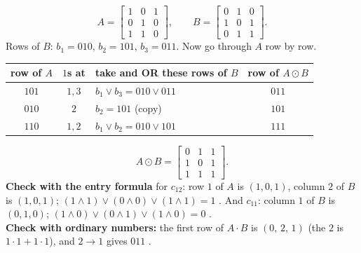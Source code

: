 \documentclass{fkt-notes}
\theoremstyle{definition}
\begin{document}
\begin{example}
  \[
    A=\begin{bmatrix}1&0&1\\0&1&0\\1&1&0\end{bmatrix},\qquad
    B=\begin{bmatrix}0&1&0\\1&0&1\\0&1&1\end{bmatrix}.
  \]
  Rows of $B$: $b_1=010$, $b_2=101$, $b_3=011$. Now go through $A$ row by row.
  \begin{center}
    \renewcommand{\arraystretch}{1.25}
    \begin{tabular}{@{}c@{\quad}c@{\quad}l@{\quad}c@{}}
      \toprule
      row of $A$ & $1$s at & take and OR these rows of $B$ & row of $A\odot B$ \\
      \midrule
      $101$ & $1,3$ & $b_1\vee b_3=010\vee011$ & $011$ \\
      $010$ & $2$   & $b_2=101$ (copy)          & $101$ \\
      $110$ & $1,2$ & $b_1\vee b_2=010\vee101$ & $111$ \\
      \bottomrule
    \end{tabular}
  \end{center}
  \[
    A\odot B=\begin{bmatrix}0&1&1\\1&0&1\\1&1&1\end{bmatrix}.
  \]
  \textbf{Check with the entry formula} for $c_{12}$: row $1$ of $A$ is
  $(1,0,1)$, column $2$ of $B$ is $(1,0,1)$; $(1\wedge1)\vee(0\wedge0)\vee(1\wedge1)=1$ \checkmark.
  And $c_{11}$: column $1$ of $B$ is $(0,1,0)$; $(1\wedge0)\vee(0\wedge1)\vee(1\wedge0)=0$ \checkmark.\\
  \textbf{Check with ordinary numbers:} the first row of $A\cdot B$ is
  $(0,\,2,\,1)$ (the $2$ is $1\cdot1+1\cdot1$), and $2\to1$ gives $011$ \checkmark.
\end{example}
\end{document}
